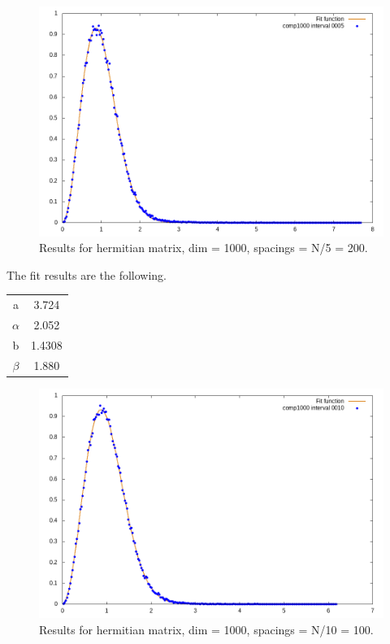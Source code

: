 \documentclass[12pt, a4paper, notitlepage]{report}
\begin{document}
\newpage

\begin{figure}[H]
	\centering
	\includegraphics[scale=0.6]{./Comp_1000/hist_interval_0200_fit.png} 
	\caption{Results for hermitian matrix, dim = 1000, spacings = N/5 = 200.}
	\label{figure_lambdas}
\end{figure}

The fit results are the following.

\begin{table}[H]
	\centering
	\begin{tabular}{|c|c|}
		
		\hline
		     
		a			& 3.724	\\
		$\alpha$	& 2.052	\\
		b			& 1.4308	\\
		$\beta$		& 1.880 \\
		
		\hline
		
	\end{tabular}
\end{table}

\newpage

\begin{figure}[H]
	\centering
	\includegraphics[scale=0.6]{./Comp_1000/hist_interval_0100_fit.png} 
	\caption{Results for hermitian matrix, dim = 1000, spacings = N/10 = 100.}
	\label{figure_lambdas}
\end{figure}
\end{document}
